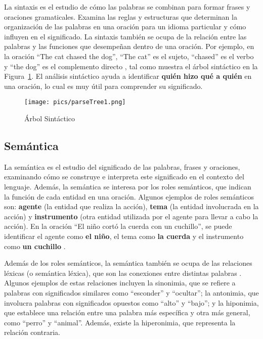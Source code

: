 La sintaxis es el estudio de cómo las palabras se combinan para formar frases y oraciones gramaticales. Examina las reglas y estructuras que determinan la organización de las palabras en una oración para un idioma particular y cómo influyen en el significado. La sintaxis también se ocupa de la relación entre las palabras y las funciones que desempeñan dentro de una oración. Por ejemplo, en la oración ``The cat chased the dog'', ``The cat'' es el sujeto, ``chased'' es el verbo y ``the dog'' es el complemento directo \cite{JohnsonMLSS}, tal como muestra el árbol sintáctico en la Figura~\ref{fig:arbol_sintactico}. El análisis sintáctico ayuda a identificar \textbf{quién hizo qué a quién} en una oración, lo cual es muy útil para comprender su significado.

\begin{figure}[h]
	\centering
	\texttt{[image: pics/parseTree1.png]}
	\caption{Árbol Sintáctico}
	\label{fig:arbol_sintactico}
\end{figure}




\subsection{Semántica}

La semántica es el estudio del significado de las palabras, frases y oraciones, examinando cómo se construye e interpreta este significado en el contexto del lenguaje. Además, la semántica se interesa por los roles semánticos, que indican la función de cada entidad en una oración.  Algunos ejemplos de roles semánticos son: \textcolor[rgb]{0.00,0.00,1.00}{\textbf{agente}} (la entidad que realiza la acción), \textcolor[rgb]{1.00,0.00,0.00}{\textbf{tema}} (la entidad involucrada en la acción) y \textcolor[rgb]{0.00,1.00,0.00}{\textbf{instrumento}} (otra entidad utilizada por el agente para llevar a cabo la acción). En la oración ``El niño cortó la cuerda con un cuchillo'', se puede identificar el agente como \textcolor[rgb]{0.00,0.00,1.00}{\textbf{el niño}}, el tema como \textcolor[rgb]{1.00,0.00,0.00}{\textbf{la cuerda}} y el instrumento como \textcolor[rgb]{0.00,1.00,0.00}{\textbf{un cuchillo}} \cite{JohnsonMLSS}.

Además de los roles semánticos, la semántica también se ocupa de las relaciones léxicas (o semántica léxica), que son las conexiones entre distintas palabras \cite{yule2016study}. Algunos ejemplos de estas relaciones incluyen la sinonimia, que se refiere a palabras con significados similares como ``esconder'' y ``ocultar''; la antonimia, que involucra palabras con significados opuestos como ``alto'' y ``bajo''; y la hiponimia, que establece una relación entre una palabra más específica y otra más general, como ``perro'' y ``animal''. Además, existe la hiperonimia, que representa la relación contraria.

